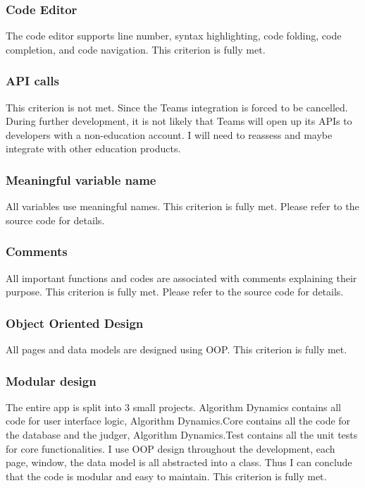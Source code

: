 \documentclass[report.tex]{subfiles}
\begin{document}
\subsubsection{Code Editor}

The code editor supports line number, syntax highlighting, code folding, code completion, and code navigation. This criterion is fully met.

\subsubsection{API calls}

This criterion is not met. Since the Teams integration is forced to be cancelled. During further development, it is not likely that Teams will open up its APIs to developers with a non-education account. I will need to reassess and maybe integrate with other education products.

\subsubsection{Meaningful variable name}

All variables use meaningful names. This criterion is fully met. Please refer to the source code for details.

\subsubsection{Comments}

All important functions and codes are associated with comments explaining their purpose. This criterion is fully met. Please refer to the source code for details.

\subsubsection{Object Oriented Design}

All pages and data models are designed using OOP. This criterion is fully met.

\subsubsection{Modular design}

The entire app is split into 3 small projects. Algorithm Dynamics contains all code for user interface logic, Algorithm Dynamics.Core contains all the code for the database and the judger, Algorithm Dynamics.Test contains all the unit tests for core functionalities. I use OOP design throughout the development, each page, window, the data model is all abstracted into a class. Thus I can conclude that the code is modular and easy to maintain. This criterion is fully met.
\end{document}
